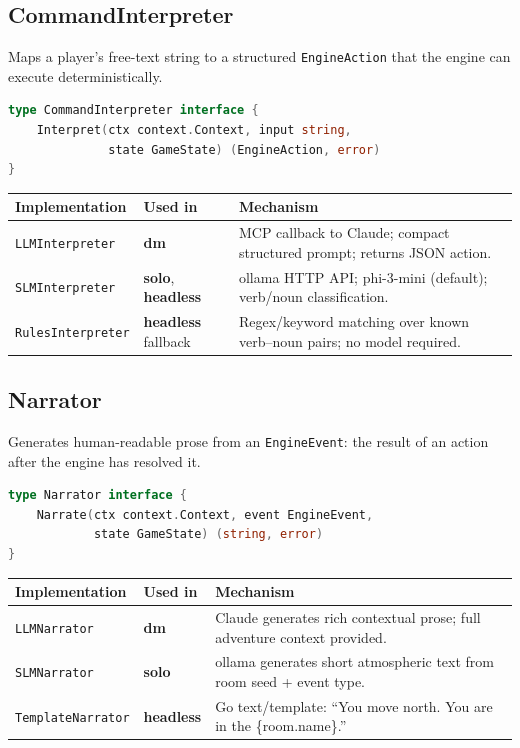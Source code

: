 \documentclass[a4paper,10pt]{article}
\newcommand{\mode}[1]{\textbf{#1}}
\begin{document}
\subsection{CommandInterpreter}

Maps a player's free-text string to a structured
\texttt{EngineAction} that the engine can execute deterministically.

\begin{lstlisting}[language=Go]
type CommandInterpreter interface {
    Interpret(ctx context.Context, input string,
              state GameState) (EngineAction, error)
}
\end{lstlisting}

\begin{center}
\begin{tabular}{lll}
\toprule
\textbf{Implementation} & \textbf{Used in} & \textbf{Mechanism} \\
\midrule
\texttt{LLMInterpreter}
  & \mode{dm}
  & MCP callback to Claude; compact structured prompt; returns JSON action. \\
\texttt{SLMInterpreter}
  & \mode{solo}, \mode{headless}
  & ollama HTTP API; phi-3-mini (default); verb/noun classification. \\
\texttt{RulesInterpreter}
  & \mode{headless} fallback
  & Regex/keyword matching over known verb--noun pairs; no model required. \\
\bottomrule
\end{tabular}
\end{center}

\subsection{Narrator}

Generates human-readable prose from an \texttt{EngineEvent}: the
result of an action after the engine has resolved it.

\begin{lstlisting}[language=Go]
type Narrator interface {
    Narrate(ctx context.Context, event EngineEvent,
            state GameState) (string, error)
}
\end{lstlisting}

\begin{center}
\begin{tabular}{lll}
\toprule
\textbf{Implementation} & \textbf{Used in} & \textbf{Mechanism} \\
\midrule
\texttt{LLMNarrator}
  & \mode{dm}
  & Claude generates rich contextual prose; full adventure context provided. \\
\texttt{SLMNarrator}
  & \mode{solo}
  & ollama generates short atmospheric text from room seed + event type. \\
\texttt{TemplateNarrator}
  & \mode{headless}
  & Go text/template: ``You move north. You are in the \{room.name\}.'' \\
\bottomrule
\end{tabular}
\end{center}
\end{document}
